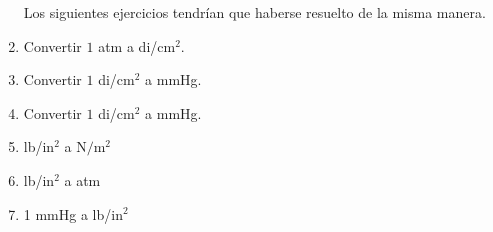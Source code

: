 \documentclass[14pt]{extarticle}
\begin{document}
\begin{enumerate}
Los siguientes ejercicios tendrían que haberse resuelto de la misma manera.
\item Convertir $1$ atm a di/cm$^{2}$.
\item Convertir $1$ di/cm$^{2}$ a mmHg.
\item Convertir $1$ di/cm$^{2}$ a mmHg.
\item lb/in$^{2}$ a {$\displaystyle \unit{\newton\per\square\meter}$}
\item lb/in$^{2}$ a atm
\item 1 mmHg a lb/in$^{2}$
\end{enumerate}
\end{document}
